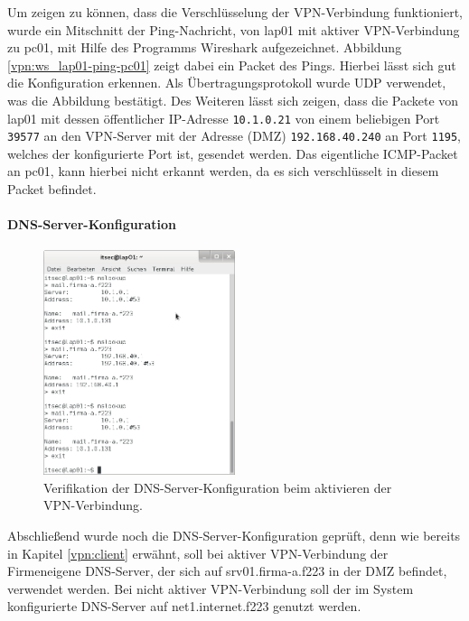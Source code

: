 Um zeigen zu können, dass die Verschlüsselung der VPN-Verbindung funktioniert, wurde ein Mitschnitt der Ping-Nachricht, von lap01 mit aktiver VPN-Verbindung zu pc01, mit Hilfe des Programms Wireshark aufgezeichnet.
Abbildung \ref{vpn:ws_lap01-ping-pc01} zeigt dabei ein Packet des Pings. Hierbei lässt sich gut die Konfiguration erkennen. Als Übertragungsprotokoll wurde UDP verwendet, was die Abbildung bestätigt. Des Weiteren lässt sich zeigen, dass die Packete von lap01 mit dessen öffentlicher IP-Adresse \texttt{10.1.0.21} von einem beliebigen Port \texttt{39577} an den VPN-Server mit der Adresse (DMZ) \texttt{192.168.40.240} an Port \texttt{1195}, welches der konfigurierte Port ist, gesendet werden. Das eigentliche ICMP-Packet an pc01, kann hierbei nicht erkannt werden, da es sich verschlüsselt in diesem Packet befindet.

\paragraph{DNS-Server-Konfiguration}

\begin{figure}[h!]
  \centering
    \includegraphics[width=0.5\textwidth]{figures/vpn_nslookup.png}
  \caption{Verifikation der DNS-Server-Konfiguration beim aktivieren der VPN-Verbindung.}
  \label{vpn:lap01_nslookup}
\end{figure}

Abschließend wurde noch die DNS-Server-Konfiguration geprüft, denn wie bereits in Kapitel \ref{vpn:client} erwähnt, soll bei aktiver VPN-Verbindung der Firmeneigene DNS-Server, der sich auf srv01.firma-a.f223 in der DMZ befindet, verwendet werden. Bei nicht aktiver VPN-Verbindung soll der im System konfigurierte DNS-Server auf net1.internet.f223 genutzt werden.

